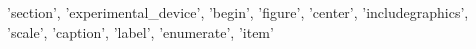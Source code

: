 {'section', 'experimental_device', 'begin', 'figure', 'center', 'includegraphics', 'scale', 'caption', 'label', 'enumerate', 'item'}
